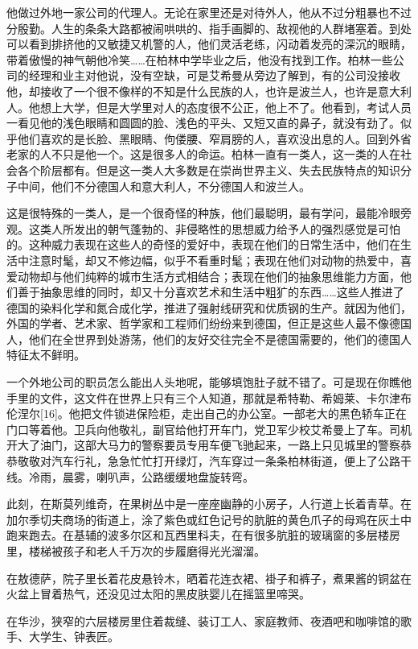他做过外地一家公司的代理人。无论在家里还是对待外人，他从不过分粗暴也不过分殷勤。人生的条条大路都被闹哄哄的、指手画脚的、敌视他的人群堵塞着。到处可以看到排挤他的又敏捷又机警的人，他们灵活老练，闪动着发亮的深沉的眼睛，带着傲慢的神气朝他冷笑……在柏林中学毕业之后，他没有找到工作。柏林一些公司的经理和业主对他说，没有空缺，可是艾希曼从旁边了解到，有的公司没接收他，却接收了一个很不像样的不知是什么民族的人，也许是波兰人，也许是意大利人。他想上大学，但是大学里对人的态度很不公正，他上不了。他看到，考试人员一看见他的浅色眼睛和圆圆的脸、浅色的平头、又短又直的鼻子，就没有劲了。似乎他们喜欢的是长脸、黑眼睛、佝偻腰、窄肩膀的人，喜欢没出息的人。回到外省老家的人不只是他一个。这是很多人的命运。柏林一直有一类人，这一类的人在社会各个阶层都有。但是这一类人大多数是在崇尚世界主义、失去民族特点的知识分子中间，他们不分德国人和意大利人，不分德国人和波兰人。

这是很特殊的一类人，是一个很奇怪的种族，他们最聪明，最有学问，最能冷眼旁观。这类人所发出的朝气蓬勃的、非侵略性的思想威力给予人的强烈感觉是可怕的。这种威力表现在这些人的奇怪的爱好中，表现在他们的日常生活中，他们在生活中注意时髦，却又不修边幅，似乎不看重时髦；表现在他们对动物的热爱中，喜爱动物却与他们纯粹的城市生活方式相结合；表现在他们的抽象思维能力方面，他们善于抽象思维的同时，却又十分喜欢艺术和生活中粗犷的东西……这些人推进了德国的染料化学和氮合成化学，推进了强射线研究和优质钢的生产。就因为他们，外国的学者、艺术家、哲学家和工程师们纷纷来到德国，但正是这些人最不像德国人，他们在全世界到处游荡，他们的友好交往完全不是德国需要的，他们的德国人特征太不鲜明。

一个外地公司的职员怎么能出人头地呢，能够填饱肚子就不错了。可是现在你瞧他手里的文件，这文件在世界上只有三个人知道，那就是希特勒、希姆莱、卡尔津布伦涅尔[16]。他把文件锁进保险柜，走出自己的办公室。一部老大的黑色轿车正在门口等着他。卫兵向他敬礼，副官给他打开车门，党卫军少校艾希曼上了车。司机开大了油门，这部大马力的警察要员专用车便飞驰起来，一路上只见城里的警察恭恭敬敬对汽车行礼，急急忙忙打开绿灯，汽车穿过一条条柏林街道，便上了公路干线。冷雨，晨雾，喇叭声，公路缓缓地盘旋转弯。

此刻，在斯莫列维奇，在果树丛中是一座座幽静的小房子，人行道上长着青草。在加尔季切夫商场的街道上，涂了紫色或红色记号的肮脏的黄色爪子的母鸡在灰土中跑来跑去。在基辅的波多尔区和瓦西里科夫，在有很多肮脏的玻璃窗的多层楼房里，楼梯被孩子和老人千万次的步履磨得光光溜溜。

在敖德萨，院子里长着花皮悬铃木，晒着花连衣裙、褂子和裤子，煮果酱的铜盆在火盆上冒着热气，还没见过太阳的黑皮肤婴儿在摇篮里啼哭。

在华沙，狭窄的六层楼房里住着裁缝、装订工人、家庭教师、夜酒吧和咖啡馆的歌手、大学生、钟表匠。

